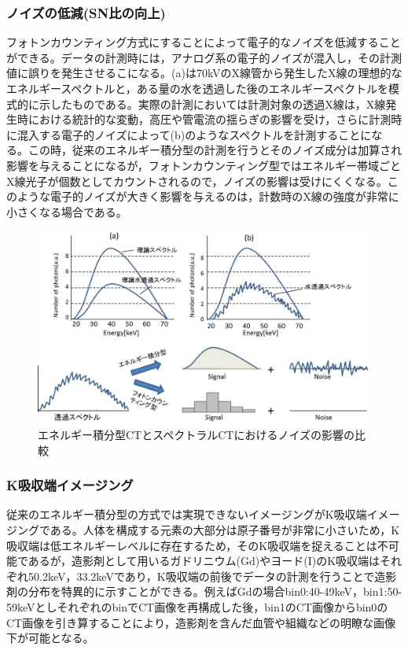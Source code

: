 \subsubsection*{ノイズの低減(SN比の向上)\label{sec:pulse_merit}}
フォトンカウンティング方式にすることによって電子的なノイズを低減することができる。データの計測時には，アナログ系の電子的ノイズが混入し，その計測値に誤りを発生させるこになる。(a)は70kVのX線管から発生したX線の理想的なエネルギースペクトルと，ある量の水を透過した後のエネルギースペクトルを模式的に示したものである。実際の計測においては計測対象の透過X線は，X線発生時における統計的な変動，高圧や管電流の揺らぎの影響を受け，さらに計測時に混入する電子的ノイズによって(b)のようなスペクトルを計測することになる。この時，従来のエネルギー積分型の計測を行うとそのノイズ成分は加算され影響を与えることになるが，フォトンカウンティング型ではエネルギー帯域ごとX線光子が個数としてカウントされるので，ノイズの影響は受けにくくなる。このような電子的ノイズが大きく影響を与えるのは，計数時のX線の強度が非常に小さくなる場合である。

\begin{figure}[H]
 \begin{center}
 \includegraphics[width=12cm]{image/other/noise_affect.eps}
 \end{center}
 \caption{エネルギー積分型CTとスペクトラルCTにおけるノイズの影響の比較\cite{ogawa_kaisetu}}
 \label{fig:noise_affect}
\end{figure}

\subsubsection*{K吸収端イメージング}
従来のエネルギー積分型の方式では実現できないイメージングがK吸収端イメージングである。人体を構成する元素の大部分は原子番号が非常に小さいため，K吸収端は低エネルギーレベルに存在するため，そのK吸収端を捉えることは不可能であるが，造影剤として用いるガドリニウム(Gd)やヨード(I)のK吸収端はそれぞれ50.2keV，33.2keVであり，K吸収端の前後でデータの計測を行うことで造影剤の分布を特異的に示すことができる。例えばGdの場合bin0:40-49keV，bin1:50-59keVとしそれぞれのbinでCT画像を再構成した後，bin1のCT画像からbin0のCT画像を引き算することにより，造影剤を含んだ血管や組織などの明瞭な画像下が可能となる。

